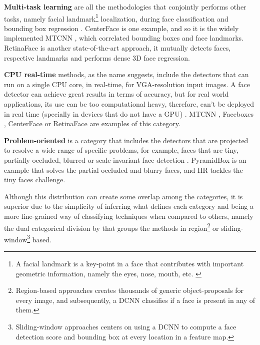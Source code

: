 \documentclass[class=report, crop=false, a4paper, 12pt]{standalone}
\begin{document}
\vspace{\baselineskip}
\label{mt learning}
\par \noindent \textbf{Multi-task learning} are all the methodologies that conjointly performs other tasks, namely facial landmark\footnote{A facial landmark is a key-point in a face that contributes with important geometric information, namely the eyes, nose, mouth, etc. \autocite{fengWingLossRobust2018}} localization, during face classification and bounding box regression \autocite{duElementsEndtoendDeep2022}. CenterFace \autocite{xuCenterFaceJointFace2019} is one example, and so it is the widely implemented MTCNN \autocite{zhangJointFaceDetection2016a}, which correlated bounding boxes and face landmarks. RetinaFace \autocite{dengRetinaFaceSinglestageDense2019} is another state-of-the-art approach, it mutually detects faces, respective landmarks and performs dense 3D face regression.

\vspace{\baselineskip}
\par \noindent \textbf{CPU real-time} methods, as the name suggests, include the detectors that can run on a single CPU core, in real-time, for VGA-resolution input images. A face detector can achieve great results in terms of accuracy, but for real world applications, its use can be too computational heavy, therefore, can't be deployed in real time (specially in devices that do not have a GPU) \autocite{duElementsEndtoendDeep2022}. MTCNN \autocite{zhangJointFaceDetection2016a}, Faceboxes \autocite{zhangFaceBoxesCPURealtime2018}, CenterFace \autocite{xuCenterFaceJointFace2019} or RetinaFace \autocite{dengRetinaFaceSinglestageDense2019} are examples of this category.

\vspace{\baselineskip}
\par \noindent \textbf{Problem-oriented} is a category that includes the detectors that are projected to resolve a wide range of specific problems, for example, faces that are tiny, partially occluded, blurred or scale-invariant face detection \autocite{duElementsEndtoendDeep2022}. PyramidBox \autocite{tangPyramidBoxContextassistedSingle2018} is an example that solves the partial occluded and blurry faces, and HR \autocite{huFindingTinyFaces2017} tackles the tiny faces challenge.

\vspace{\baselineskip}
Although this distribution can create some overlap among the categories, it is superior due to the simplicity of inferring what defines each category and being a more fine-grained way of classifying techniques when compared to others, namely the dual categorical division by \autocite{ranjanDeepLearningUnderstanding2018} that groups the methods in region\footnote{Region-based approaches creates thousands of generic object-proposals for every image, and subsequently, a DCNN classifies if a face is present in any of them.} or sliding-window\footnote{Sliding-window approaches centers on using a DCNN to compute a face detection score and bounding box at every location in a feature map.} based. 
\end{document}
